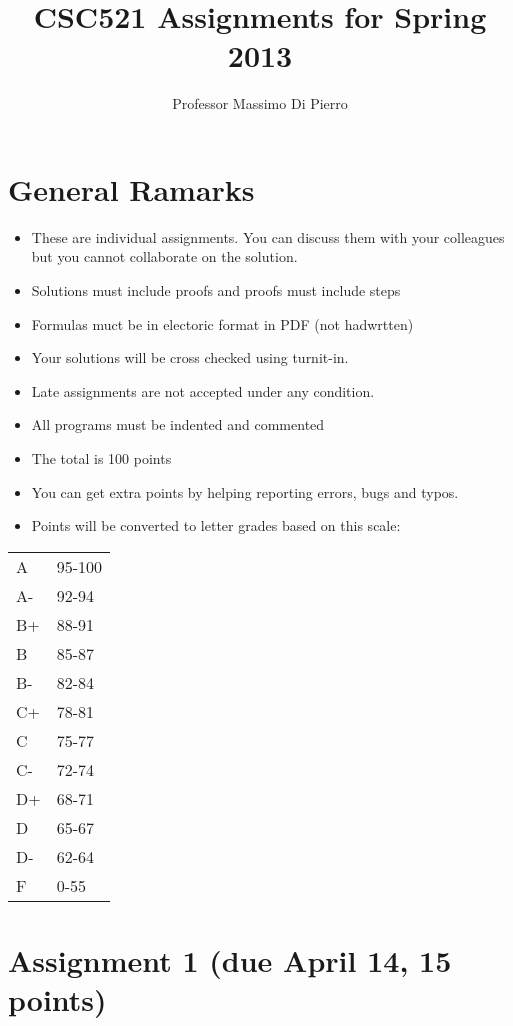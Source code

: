 \documentclass[12pt]{article}
\title{CSC521 Assignments for Spring 2013}
\author{Professor Massimo Di Pierro}
\begin{document}
\maketitle

\section*{General Ramarks}

\begin{itemize}
\item These are individual assignments. You can discuss them with your colleagues but you cannot collaborate on the solution.
\item Solutions must include proofs and proofs must include steps
\item Formulas muct be in electoric format in PDF (not hadwrtten)
\item Your solutions will be cross checked using turnit-in.
\item Late assignments are not accepted under any condition.
\item All programs must be indented and commented
\item The total is 100 points
\item You can get extra points by helping reporting errors, bugs and typos.
\item Points will be converted to letter grades based on this scale:
\end{itemize}

\begin{tabular}{ll} \hline
  A & 95-100 \\
  A- & 92-94 \\
  B+ & 88-91 \\
  B  & 85-87 \\
  B- & 82-84 \\
  C+ & 78-81 \\
  C & 75-77 \\
  C- & 72-74 \\
  D+ & 68-71 \\
  D & 65-67 \\
  D- & 62-64 \\
  F & 0-55  \\ \hline
\end{tabular}

\section{Assignment 1 (due April 14, 15 points)}
\end{document}
